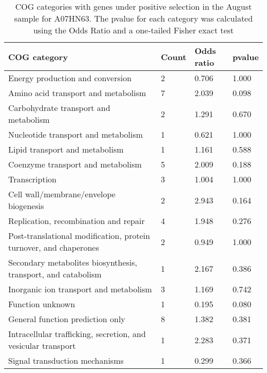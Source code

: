 \begin{table}[hb]
\footnotesize 
	\tabcolsep=0.11cm 
\caption{COG categories with genes under positive selection in the August sample for A07HN63. The pvalue for each category was calculated using the Odds Ratio and a one-tailed Fisher exact test} 
\begin{tabularx}{\textwidth}{L{6cm}R{2cm}R{2cm}R{2cm}} 
\hline 
\textbf{COG category} & \textbf{Count} & \textbf{Odds ratio} & \textbf{pvalue} \\ 
\hline 
Energy production and conversion & 2 & 0.706 & 1.000 \\ 
Amino acid transport and metabolism & 7 & 2.039 & 0.098 \\ 
Carbohydrate transport and metabolism & 2 & 1.291 & 0.670 \\ 
Nucleotide transport and metabolism & 1 & 0.621 & 1.000 \\ 
Lipid transport and metabolism & 1 & 1.161 & 0.588 \\ 
Coenzyme transport and metabolism & 5 & 2.009 & 0.188 \\ 
Transcription & 3 & 1.004 & 1.000 \\ 
Cell wall/membrane/envelope biogenesis & 2 & 2.943 & 0.164 \\ 
Replication, recombination and repair & 4 & 1.948 & 0.276 \\ 
Post-translational modification, protein turnover, and chaperones & 2 & 0.949 & 1.000 \\ 
Secondary metabolites biosynthesis, transport, and catabolism & 1 & 2.167 & 0.386 \\ 
Inorganic ion transport and metabolism & 3 & 1.169 & 0.742 \\ 
Function unknown & 1 & 0.195 & 0.080 \\ 
General function prediction only & 8 & 1.382 & 0.381 \\ 
Intracellular trafficking, secretion, and vesicular transport & 1 & 2.283 & 0.371 \\ 
Signal transduction mechanisms & 1 & 0.299 & 0.366 \\ 
\end{tabularx} 
\label{August_COG_Selection_A07HN63} 
 \end{table} 

